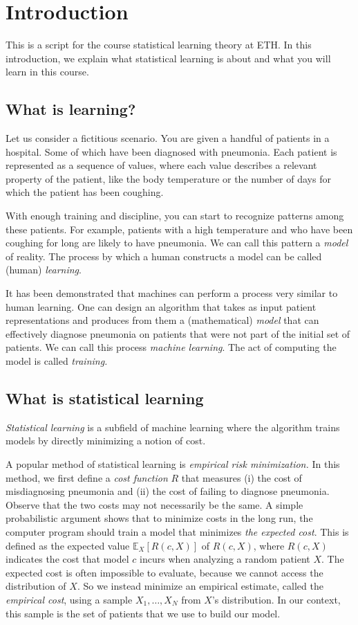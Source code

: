 \chapter*{Introduction}

This is a script for the course statistical learning theory at ETH. In this introduction, we explain what statistical learning is about and what you will learn in this course.

\section*{What is learning?}

Let us consider a fictitious scenario. You are given a handful of patients
in a hospital. Some of which have been diagnosed with pneumonia. Each
patient is represented as a sequence of values, where each value describes a
relevant property of the patient, like the body temperature or the number
of days for which the patient has been coughing.

With enough training and discipline, you can start to recognize patterns
among these patients. For example, patients with a high temperature and
who have been coughing for long are likely to have pneumonia. We can call this pattern a \emph{model} of reality. The process by which a human constructs a model can be called (human) \emph{learning}.

It has been demonstrated that machines can perform a process very
similar to human learning. One can design an algorithm that takes as
input patient representations and produces from them a (mathematical) \emph{model} that can
effectively diagnose pneumonia on patients that were not part of the initial
set of patients. We can call this process \emph{machine learning}. The act of
computing the model is called \emph{training.}

\section*{What is statistical learning}

\emph{Statistical learning} is a subfield of machine learning where the algorithm
trains models by directly minimizing a notion of cost.

A popular method of statistical learning is \emph{empirical risk minimization.}
In this method, we first define a \emph{cost function} $R$ that measures (i) the
cost of misdiagnosing pneumonia and (ii) the cost of failing to diagnose
pneumonia. Observe that the two costs may not necessarily be the same.
A simple probabilistic argument shows that to minimize costs in the
long run, the computer program should train a model that minimizes \emph{the
expected cost}. This is defined as the expected value $\mathbb{E}_X\left[R(c, X)\right]$ of $R(c,X)$,
where $R(c, X)$ indicates the cost that model $c$ incurs when analyzing a
random patient $X$.
The expected cost is often impossible to evaluate, because we cannot
access the distribution of $X$. So we instead minimize an empirical estimate, called the \emph{empirical cost}, using a sample $X_1, \ldots, X_N$ from $X$'s distribution. In our context, this sample is the set of patients that we use
to build our model.

